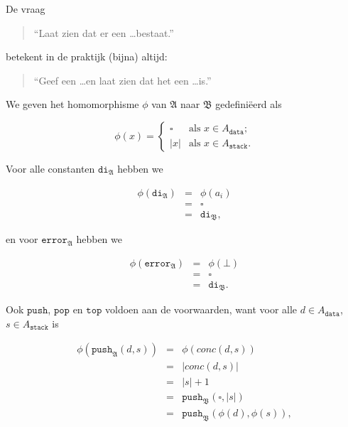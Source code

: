 \documentclass[a4paper,11pt]{article}
\begin{document}
De vraag
\begin{quote}
``Laat zien dat er een \ldots bestaat.''
\end{quote}
betekent in de praktijk (bijna) altijd:
\begin{quote}
``Geef een \ldots en laat zien dat het een \ldots is.''
\end{quote}

We geven het homomorphisme $\phi$ van $\mathfrak{A}$ naar $\mathfrak{B}$
gedefini\"eerd als

\begin{displaymath}
\phi(x) = \begin{cases}
  \square & \text{als $x \in A_{\texttt{data}}$;} \\
  |x|     & \text{als $x \in A_{\texttt{stack}}$.}
\end{cases}
\end{displaymath}

Voor alle constanten $\texttt{di}_{\mathfrak{A}}$ hebben we

\begin{eqnarray*}
\phi(\texttt{di}_{\mathfrak{A}}) & = & \phi(a_{i}) \\
                                 & = & \square \\
                                 & = & \texttt{di}_{\mathfrak{B}},
\end{eqnarray*}

en voor $\texttt{error}_{\mathfrak{A}}$ hebben we

\begin{eqnarray*}
\phi(\texttt{error}_{\mathfrak{A}}) & = & \phi(\bot) \\
                                    & = & \square \\
                                    & = & \texttt{di}_{\mathfrak{B}}.
\end{eqnarray*}

Ook $\texttt{push}$, $\texttt{pop}$ en $\texttt{top}$ voldoen aan de
voorwaarden, want voor alle $d \in A_{\texttt{data}}$, $s \in
A_{\texttt{stack}}$ is

\begin{eqnarray*}
\phi(\texttt{push}_{\mathfrak{A}}(d,s)) & = & \phi(conc(d,s)) \\
                                        & = & |conc(d,s)| \\
                                        & = & |s| + 1 \\
                                        & = & \texttt{push}_{\mathfrak{B}}(\square,|s|) \\
                                        & = & \texttt{push}_{\mathfrak{B}}(\phi(d),\phi(s)),
\end{eqnarray*}
\end{document}
